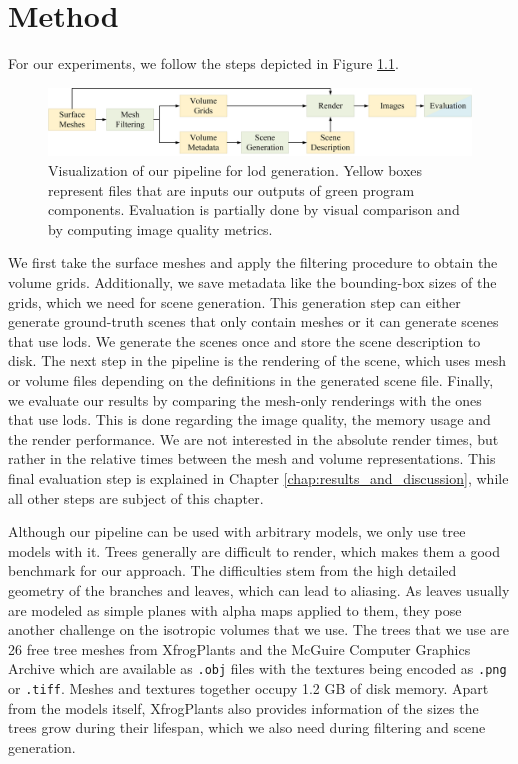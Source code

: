 \chapter{Method}
\label{chap:method}
For our experiments, we follow the steps depicted in Figure \ref{fig:pipeline}.
\begin{figure}[t]
    \centering
    \includegraphics[width=1.0\linewidth]{img/pipeline.png}
    \caption[Visualization of the pipeline the thesis built upon]{Visualization of our pipeline for \ac{lod} generation. Yellow boxes represent files that are inputs our outputs of green program components. Evaluation is partially done by visual comparison and by computing image quality metrics.}
    \label{fig:pipeline}
\end{figure}
We first take the surface meshes and apply the filtering procedure to obtain the volume grids.
Additionally, we save metadata like the bounding-box sizes of the grids, which we need for scene generation.
This generation step can either generate ground-truth scenes that only contain meshes or it can generate scenes that use \acp{lod}.
We generate the scenes once and store the scene description to disk.
The next step in the pipeline is the rendering of the scene, which uses mesh or volume files depending on the definitions in the generated scene file.
Finally, we evaluate our results by comparing the mesh-only renderings with the ones that use \acsp{lod}.
This is done regarding the image quality, the memory usage and the render performance.
We are not interested in the absolute render times, but rather in the relative times between the mesh and volume representations.
This final evaluation step is explained in Chapter \ref{chap:results_and_discussion}, while all other steps are subject of this chapter.

Although our pipeline can be used with arbitrary models, we only use tree models with it.
Trees generally are difficult to render, which makes them a good benchmark for our approach.
The difficulties stem from the high detailed geometry of the branches and leaves, which can lead to aliasing.
As leaves usually are modeled as simple planes with alpha maps applied to them, they pose another challenge on the isotropic volumes that we use.
The trees that we use are 26 free tree meshes from XfrogPlants \cite{xfrogplants} and the McGuire Computer Graphics Archive \cite{McGuire2017Data} which are available as \texttt{.obj} files with the textures being encoded as \texttt{.png} or \texttt{.tiff}.
Meshes and textures together occupy 1.2 GB of disk memory.
Apart from the models itself, XfrogPlants also provides information of the sizes the trees grow during their lifespan, which we also need during filtering and scene generation.

